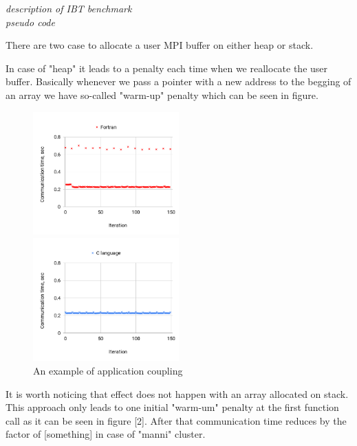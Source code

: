 \medskip
\emph{description of IBT benchmark}\\
\emph{pseudo code}
\medskip




There are two case to allocate a user MPI buffer on either heap or stack.


In case of "heap" it leads to a penalty each time when we reallocate the user buffer. Basically whenever we pass a pointer with a new address to the begging of an array we have so-called "warm-up" penalty which can be seen in figure. 


\begin{figure}[htpb]
\begin{multicols}{2}
  \centering
  \includegraphics[width=0.5\textwidth]{figures/MPI_Ibcast-performance-Fortran-language.png}\par
   
   \centering
  \includegraphics[width=0.5\textwidth]{figures/MPI_Ibcast-performance-C-language.png}\par
\end{multicols}
\caption{An example of application coupling}
\end{figure}


It is worth noticing that effect does not happen with an array allocated on stack. This approach only leads to one initial "warm-um" penalty at the first function call as it can be seen in figure [2]. After that communication time reduces by the factor of [something] in case of "manni" cluster. 


